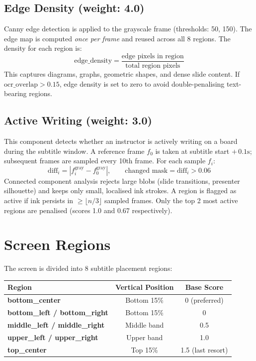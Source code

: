 \documentclass[11pt]{article}
\begin{document}
\subsection*{Edge Density (weight: 4.0)}
Canny edge detection is applied to the grayscale frame (thresholds: 50, 150). The edge map is computed \emph{once per frame} and reused across all 8 regions. The density for each region is:
\[
\text{edge\_density} = \frac{\text{edge pixels in region}}{\text{total region pixels}}
\]
This captures diagrams, graphs, geometric shapes, and dense slide content. If \(\text{ocr\_overlap} > 0.15\), edge density is set to zero to avoid double-penalising text-bearing regions.

\subsection*{Active Writing (weight: 3.0)}
This component detects whether an instructor is actively writing on a board during the subtitle window. A reference frame $f_0$ is taken at subtitle start $+\,0.1\text{s}$; subsequent frames are sampled every 10th frame. For each sample $f_i$:
\[
\text{diff}_i = |f_i^{\text{gray}} - f_0^{\text{gray}}|, \qquad
\text{changed mask} = \text{diff}_i > 0.06
\]
Connected component analysis rejects large blobs (slide transitions, presenter silhouette) and keeps only small, localised ink strokes. A region is flagged as active if ink persists in $\geq \lfloor n/3 \rfloor$ sampled frames. Only the top 2 most active regions are penalised (scores 1.0 and 0.67 respectively).

\section{Screen Regions}
The screen is divided into 8 subtitle placement regions:

\begin{center}
\begin{tabularx}{0.85\textwidth}{>{\bfseries}l c c}
\toprule
Region & Vertical Position & Base Score \\
\midrule
bottom\_center & Bottom 15\% & 0 (preferred) \\
bottom\_left / bottom\_right & Bottom 15\% & 0 \\
middle\_left / middle\_right & Middle band & 0.5 \\
upper\_left / upper\_right & Upper band & 1.0 \\
top\_center & Top 15\% & 1.5 (last resort) \\
\bottomrule
\end{tabularx}
\end{center}
\end{document}
